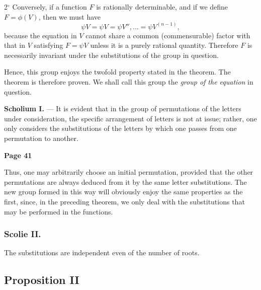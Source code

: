\documentclass{article}
\begin{document}
2\(^\circ\) Conversely, if a function \(F\) is rationally determinable, and if we define \(F = \phi(V)\), then we must have
\[
\psi V = \psi V = \psi V'', \dots = \psi V^{(n-1)},
\]
because the equation in \(V\) cannot share a common (commensurable) factor with that in \(V\) satisfying \(F = \psi V\) unless it is a purely rational quantity. Therefore \(F\) is necessarily invariant under the substitutions of the group in question.

\smallskip

\noindent
Hence, this group enjoys the twofold property stated in the theorem. The theorem is therefore proven. We shall call this group the \emph{group of the equation} in question.

\medskip

\noindent
\textbf{Scholium I.} --- It is evident that in the group of permutations of the letters under consideration, the specific arrangement of letters is not at issue; rather, one only considers the substitutions of the letters by which one passes from one permutation to another.



\newpage

\centerline{\textbf{Page 41}}

\medskip

Thus, one may arbitrarily choose an initial permutation, provided that the other permutations are always deduced from it by the same letter substitutions. The new group formed in this way will obviously enjoy the same properties as the first, since, in the preceding theorem, we only deal with the substitutions that may be performed in the functions.

\subsubsection*{Scolie II.}
The substitutions are independent even of the number of roots.

\subsection*{Proposition II}
\end{document}
